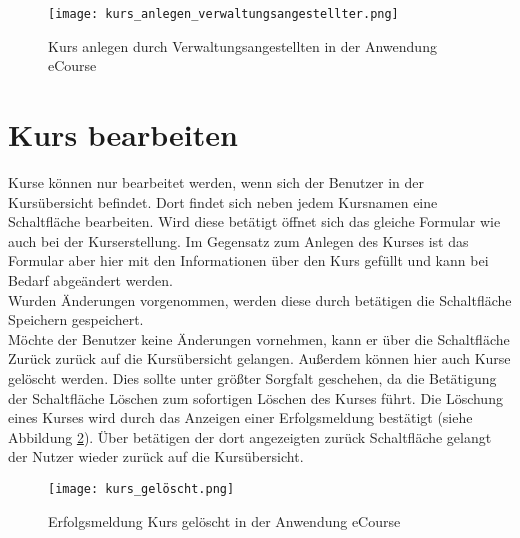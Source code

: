 \begin{figure}[h]
\centering
\texttt{[image: kurs\_anlegen\_verwaltungsangestellter.png]}
\caption{Kurs anlegen durch Verwaltungsangestellten in der Anwendung eCourse}
\label{fib:ke}
\end{figure}


\section{Kurs bearbeiten}
Kurse können nur bearbeitet werden, wenn sich der Benutzer in der Kursübersicht befindet. Dort findet sich neben jedem Kursnamen eine Schaltfläche \glqq bearbeiten\grqq . Wird diese betätigt öffnet sich das gleiche Formular wie auch bei der Kurserstellung. Im Gegensatz zum Anlegen des Kurses ist das Formular aber hier mit den Informationen über den Kurs gefüllt und kann bei Bedarf abgeändert werden.\\
Wurden Änderungen vorgenommen, werden diese durch betätigen die Schaltfläche \glqq Speichern\grqq{} gespeichert.\\
Möchte der Benutzer keine Änderungen vornehmen, kann er über die Schaltfläche \glqq Zurück\grqq{} zurück auf die Kursübersicht gelangen.
Außerdem können hier auch Kurse gelöscht werden. Dies sollte unter größter Sorgfalt geschehen, da die Betätigung der Schaltfläche \glqq Löschen\grqq{} zum sofortigen Löschen des Kurses führt. Die Löschung eines Kurses wird durch das Anzeigen einer Erfolgsmeldung bestätigt (siehe Abbildung \ref{fib:kl}). Über betätigen der dort angezeigten \glqq zurück\grqq{} Schaltfläche gelangt der Nutzer wieder zurück auf die Kursübersicht.

\begin{figure}[h]
\centering
\texttt{[image: kurs\_gelöscht.png]}
\caption{Erfolgsmeldung Kurs gelöscht in der Anwendung eCourse}
\label{fib:kl}
\end{figure}

